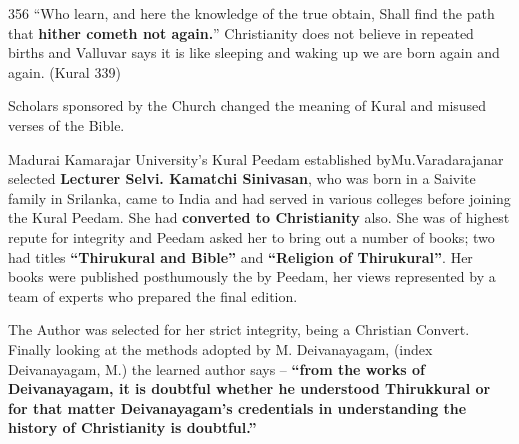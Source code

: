 356  “Who learn, and here the knowledge of the true obtain, Shall find the path that \textbf{hither cometh not again.}” Christianity does not believe in repeated births and Valluvar says it is like sleeping and waking up we are born again and again. (Kural 339)

Scholars sponsored by the Church changed the meaning of Kural and misused verses of the Bible.

Madurai Kamarajar University’s Kural Peedam established by\break Mu.Varadarajanar selected \textbf{Lecturer Selvi. Kamatchi Sinivasan}, who was born in a Saivite family in Srilanka, came to India and had served in various colleges before joining the Kural Peedam. She had \textbf{converted to Christianity} also. She was of highest repute for integrity and Peedam asked her to bring out a number of books; two had titles \textbf{“Thirukural and Bible”} and \textbf{“Religion of Thirukural”}. Her books were published posthumously the by Peedam, her views represented by a team of experts who prepared the final edition.

The Author was selected for her strict integrity, being a Christian Convert. Finally looking at the methods adopted by M. Deivanayagam, (index Deivanayagam, M.) the learned author says – \textbf{“from the works of Deivanayagam, it is doubtful whether he understood Thirukkural or for that matter Deivanayagam’s credentials in understanding the history of Christianity is doubtful.”}

